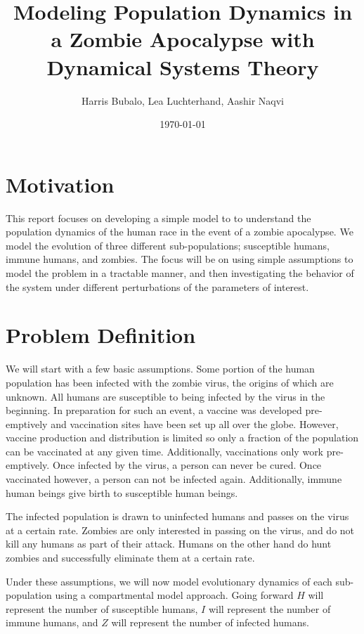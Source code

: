 \documentclass[
	12pt
]{article}
\title{Modeling Population Dynamics in a Zombie Apocalypse with Dynamical Systems Theory} %
\date{\today}
\author{Harris Bubalo, Lea Luchterhand, Aashir Naqvi}
\begin{document}
\maketitle
\pagebreak
\tableofcontents
\pagebreak
\section{Motivation}
This report focuses on developing a simple model to to understand the population dynamics of the human race in the event of a zombie apocalypse. We model the evolution of three different sub-populations; susceptible humans, immune humans, and zombies. The focus will be on using simple assumptions to model the problem in a tractable manner, and then investigating the behavior of the system under different perturbations of the parameters of interest.
\section{Problem Definition}
We will start with a few basic assumptions. Some portion of the human population has been infected with the zombie virus, the origins of which are unknown. All humans are susceptible to being infected by the virus in the beginning. In preparation for such an event, a vaccine was developed pre-emptively and vaccination sites have been set up all over the globe. However, vaccine production and distribution is limited so only a fraction of the population can be vaccinated at any given time. Additionally, vaccinations only work pre-emptively. Once infected by the virus, a person can never be cured. Once vaccinated however, a person can not be infected again. Additionally, immune human beings give birth to susceptible human beings.

The infected population is drawn to uninfected humans and passes on the virus at a certain rate. Zombies are only interested in passing on the virus, and do not kill any humans as part of their attack. Humans on the other hand do hunt zombies and successfully eliminate them at a certain rate. 

Under these assumptions, we will now model evolutionary dynamics of each sub-population using a compartmental model approach. Going forward $H$ will represent the number of susceptible humans, $I$ will represent the number of immune humans, and $Z$ will represent the number of infected humans.
\end{document}
